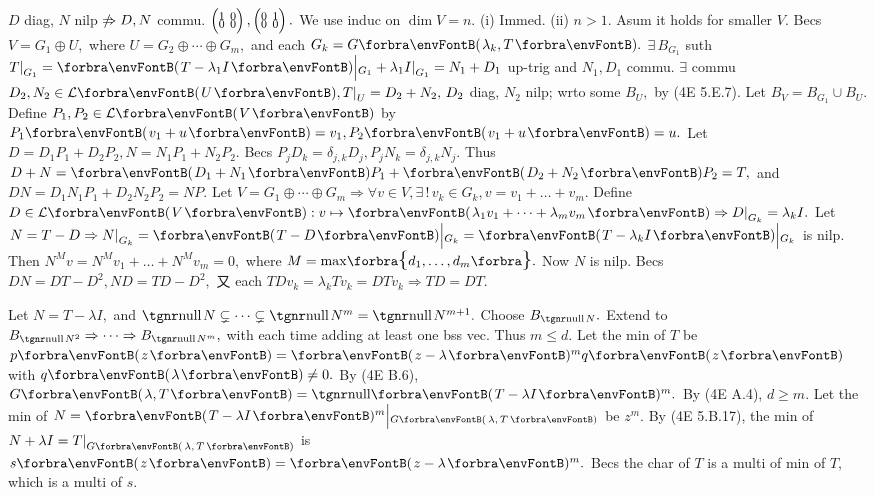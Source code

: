 \ANote $D$ diag, $N$ nilp $\notRightarrow D,N$ commu. \AExa $\footnotesize\begin{pmatrix}1&\hspace{-6pt}0\\[-4pt]0&\hspace{-6pt}0\end{pmatrix},\begin{pmatrix}0&\hspace{-6pt}1\\[-4pt]0&\hspace{-6pt}0\end{pmatrix}.$\vspace{2pt}\parSol{}
We use induc on $\dim V=n.$ (i) Immed. (ii) $n>1.$ Asum it holds for smaller $V.$\parSol{}
Becs $V=G_1\oplus U,$ where $U=G_2\oplus\cdots\oplus G_m,$ and each $G_k=G\Par{\lambda_k,T}.$\parSol{}
$\exists\,B_{G_1}$ suth $T\mmid_{G_1}=\Par{T-\lambda_1I}\Big|{_{G_1}}+\lambda_1I\mmid_{G_1}=N_1+D_1$ up-trig and $N_1,D_1$ commu.\parSol{}
$\exists$ commu $D_2,N_2\in\Lm{U},T\mmid_U=D_2+N_2,\,D_2$ diag, $N_2$ nilp; wrto some $B_U,$ by (4E 5.E.7).\parSol{}
Let $B_V=B_{G_1}\cup B_U.$ Define $P_1,P_2\in\Lm{V}$ by $P_1\Par{v_1+u}=v_1,P_2\Par{v_1+u}=u.$\parSol{}
Let $D=D_1P_1+D_2P_2,N=N_1P_1+N_2P_2.$ \:Becs $P_jD_k=\delta_{j,k}D_j,P_jN_k=\delta_{j,k}N_j.$\parSol{}
Thus $D+N=\Par{D_1+N_1}P_1+\Par{D_2+N_2}P_2=T,$ and $DN=D_1N_1P_1+D_2N_2P_2=NP.$\PfEnd\vspace{3pt}\parSol{}
\Or Let $V=G_1\oplus\cdots\oplus G_m\Rightarrow\forall v\in V,\exists\,!\,v_k\in G_k,v=v_1+\dots+v_m.$\parSol{}
Define $D\in\Lm{V}:v\mapsto\Par{\lambda_1v_1+\dots+\lambda_mv_m}\Rightarrow D\mmid_{G_k}=\lambda_kI.$\parSol{}
Let $N=T-D\Rightarrow N\mmid_{G_k}=\Par{T-D}\Big|{_{G_k}}=\Par{T-\lambda_kI}\Big|{_{G_k}}$ is nilp.\parSol{}
Then $N^Mv=N^Mv_1+\dots+N^Mv_m=0,$ where $M=\max\!\Bra{d_1,\dots,d_m}.$ Now $N$ is nilp.\parSol{}
Becs $DN=DT-D^2,ND=TD-D^2,$ 又 each $TDv_k=\lambda_kTv_k=DTv_k\Rightarrow TD=DT.$\PfEnd
\SepLine

Let $N=T-\lambda I,$ and $\null N\subsetneq\cdots\subsetneq\null N^m=\null N^{m+1}.$ Choose $B_{\null N}.$\parSol{}
Extend to $B_{\null N^2}\Rightarrow\cdots\Rightarrow B_{\null N^m},$ with each time adding at least one bss vec. Thus $m\leqslant d.$\PfEnd\vspace{3pt}\parSol{}
\Or Let the min of $T$ be $p\Par{z}=\Par{z-\lambda}{^m}q\Par{z}$ with $q\Par{\lambda}\neq0.$\parSol{}
By (4E B.6), $G\Par{\lambda,T}=\Null\Par{T-\lambda I}{^m}.$ By (4E A.4), $d\geqslant m.$\PfEnd\vspace{3pt}\parSol{}
\Or Let the min of $N=\Par{T-\lambda I}{^m}\Big|{_{G\SmallPar{\:\!\lambda,\,T\:\!}}}$ be $z^m.$\parSol{}
By (4E 5.B.17), the min of $N+\lambda I=T\mmid_{G\SmallPar{\:\!\lambda,\,T\:\!}}$ is $s\Par{z}=\Par{z-\lambda}{^m}.$\parSol{}
Becs the char of $T$  is a multi of min of $T,$ which is a multi of $s.$\PfEnd
\SepLine

